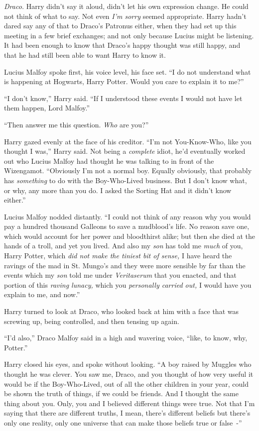 \emph{Draco.} Harry didn't say it aloud, didn't let his own expression change. He could not think of what to say. Not even \emph{I'm sorry} seemed appropriate. Harry hadn't dared say any of that to Draco's Patronus either, when they had set up this meeting in a few brief exchanges; and not only because Lucius might be listening. It had been enough to know that Draco's happy thought was still happy, and that he had still been able to want Harry to know it.

Lucius Malfoy spoke first, his voice level, his face set. ``I do not understand what is happening at Hogwarts, Harry Potter. Would you care to explain it to me?''

``I don't know,'' Harry said. ``If I understood these events I would not have let them happen, Lord Malfoy.''

``Then answer me this question. \emph{Who} are you?''

Harry gazed evenly at the face of his creditor. ``I'm not You-Know-Who, like you thought I was,'' Harry said. Not being a \emph{complete} idiot, he'd eventually worked out who Lucius Malfoy had thought he was talking to in front of the Wizengamot. ``Obviously I'm not a normal boy. Equally obviously, that probably has \emph{something} to do with the Boy-Who-Lived business. But I don't know what, or why, any more than you do. I asked the Sorting Hat and it didn't know either.''

Lucius Malfoy nodded distantly. ``I could not think of any reason why you would pay a hundred thousand Galleons to save a mudblood's life. No reason save one, which would account for her power and bloodthirst alike; but then she died at the hands of a troll, and yet you lived. And also my \emph{son} has told me \emph{much} of you, Harry Potter, which \emph{did not make the tiniest bit of sense,} I have heard the ravings of the mad in St. Mungo's and they were more sensible by far than the events which my \emph{son} told me under \emph{Veritaserum} that you enacted, and that portion of this \emph{raving lunacy,} which you \emph{personally carried out,} I would have you explain to me, and now.''

Harry turned to look at Draco, who looked back at him with a face that was screwing up, being controlled, and then tensing up again.

``I'd also,'' Draco Malfoy said in a high and wavering voice, ``like, to know, why, Potter.''

Harry closed his eyes, and spoke without looking. ``A boy raised by Muggles who thought he was clever. You saw me, Draco, and you thought of how very useful it would be if the Boy-Who-Lived, out of all the other children in your year, could be shown the truth of things, if we could be friends. And I thought the same thing about you. Only, you and I believed different things were true. Not that I'm saying that there are different truths, I mean, there's different beliefs but there's only one reality, only one universe that can make those beliefs true or false~-''

